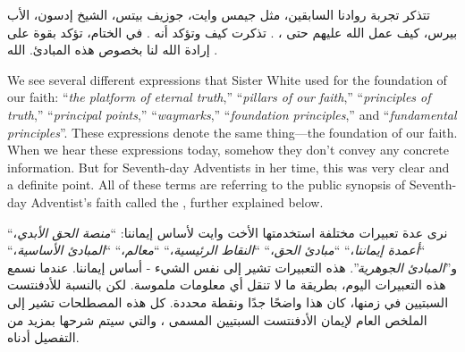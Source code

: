 تتذكر تجربة روادنا السابقين، مثل جيمس وايت، جوزيف بيتس، الشيخ إدسون، الأب بيرس، كيف عمل الله عليهم حتى ، . تذكرت كيف  وتؤكد أنه . في الختام، تؤكد بقوة على إرادة الله لنا بخصوص هذه المبادئ. الله .


We see several different expressions that Sister White used for the foundation of our faith: “\textit{the platform of eternal truth},” “\textit{pillars of our faith},” “\textit{principles of truth},” “\textit{principal points},” “\textit{waymarks},” “\textit{foundation principles},” and “\textit{fundamental principles}”. These expressions denote the same thing—the foundation of our faith. When we hear these expressions today, somehow they don’t convey any concrete information. But for Seventh-day Adventists in her time, this was very clear and a definite point. All of these terms are referring to the public synopsis of Seventh-day Adventist’s faith called the , further explained below.


نرى عدة تعبيرات مختلفة استخدمتها الأخت وايت لأساس إيماننا: “\textit{منصة الحق الأبدي}،“ “\textit{أعمدة إيماننا}،“ “\textit{مبادئ الحق}،“ “\textit{النقاط الرئيسية}،“ “\textit{معالم}،“ “\textit{المبادئ الأساسية}،“ و”\textit{المبادئ الجوهرية}”. هذه التعبيرات تشير إلى نفس الشيء - أساس إيماننا. عندما نسمع هذه التعبيرات اليوم، بطريقة ما لا تنقل أي معلومات ملموسة. لكن بالنسبة للأدفنتست السبتيين في زمنها، كان هذا واضحًا جدًا ونقطة محددة. كل هذه المصطلحات تشير إلى الملخص العام لإيمان الأدفنتست السبتيين المسمى ، والتي سيتم شرحها بمزيد من التفصيل أدناه.


